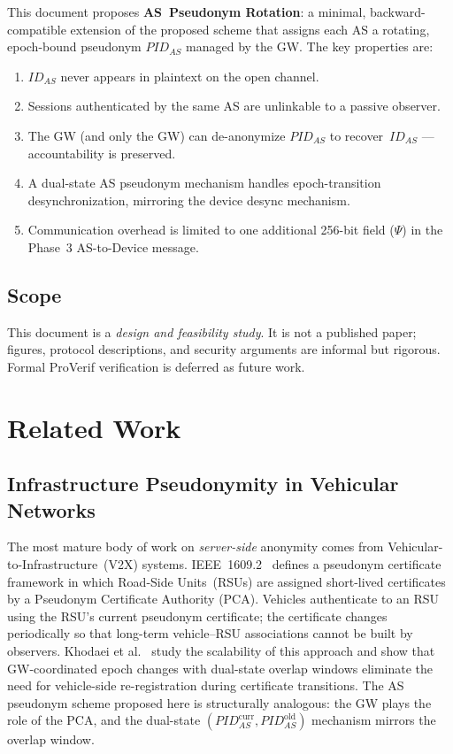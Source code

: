 \documentclass[12pt,a4paper]{article}
\newcommand{\IDas}{\mathit{ID}_{AS}}
\newcommand{\PIDas}{\mathit{PID}_{AS}}
\newcommand{\PIDascurr}{\mathit{PID}_{AS}^{\mathrm{curr}}}
\newcommand{\PIDASOld}{\mathit{PID}_{AS}^{\mathrm{old}}}
\begin{document}
This document proposes \textbf{AS~Pseudonym Rotation}: a minimal,
backward-compatible extension of the proposed scheme that assigns
each AS a rotating, epoch-bound pseudonym $\PIDas$ managed by the GW.
The key properties are:
\begin{enumerate}
  \item $\IDas$ never appears in plaintext on the open channel.
  \item Sessions authenticated by the same AS are unlinkable to a
        passive observer.
  \item The GW (and only the GW) can de-anonymize $\PIDas$ to
        recover~$\IDas$ --- accountability is preserved.
  \item A dual-state AS pseudonym mechanism handles epoch-transition
        desynchronization, mirroring the device desync mechanism.
  \item Communication overhead is limited to one additional 256-bit
        field ($\Psi$) in the Phase~3 AS-to-Device message.
\end{enumerate}

\subsection{Scope}

This document is a \emph{design and feasibility study}.
It is not a published paper; figures, protocol descriptions, and
security arguments are informal but rigorous.
Formal ProVerif verification is deferred as future work.

\section{Related Work}

\subsection{Infrastructure Pseudonymity in Vehicular Networks}

The most mature body of work on \emph{server-side} anonymity comes
from Vehicular-to-Infrastructure~(V2X) systems.
IEEE~1609.2~\cite{ieee16092} defines a pseudonym certificate framework
in which Road-Side Units~(RSUs) are assigned short-lived certificates
by a Pseudonym Certificate Authority (PCA).
Vehicles authenticate to an RSU using the RSU's current pseudonym
certificate; the certificate changes periodically so that long-term
vehicle--RSU associations cannot be built by observers.
Khodaei et al.~\cite{khodaei2018scaling} study the scalability of
this approach and show that GW-coordinated epoch changes with dual-state
overlap windows eliminate the need for vehicle-side re-registration
during certificate transitions.
The AS pseudonym scheme proposed here is structurally analogous:
the GW plays the role of the PCA, and the dual-state
$(\PIDascurr, \PIDASOld)$ mechanism mirrors the overlap window.
\end{document}
